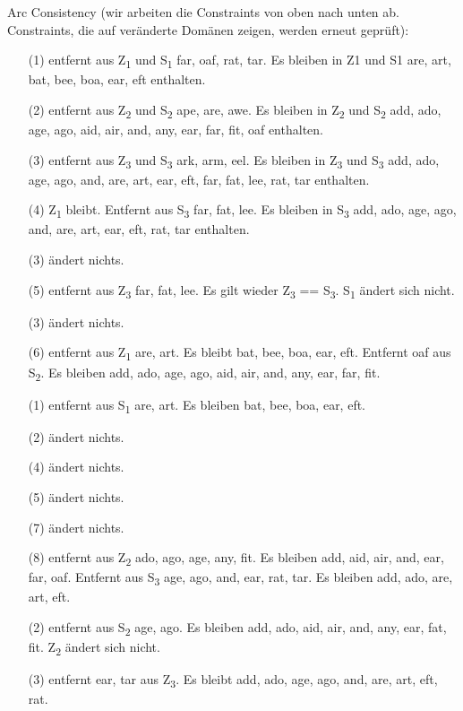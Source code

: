 \documentclass[ngerman]{fbi-aufgabenblatt}
\begin{document}
Arc Consistency (wir arbeiten die Constraints von oben nach unten ab. Constraints, die auf veränderte Domänen zeigen, werden erneut geprüft):
\begin{itemize}
	\item[(1)] entfernt aus Z\textsubscript{1} und S\textsubscript{1} far, oaf, rat, tar. Es bleiben in Z1 und S1 are, art, bat, bee, boa, ear, eft enthalten.
	\item[(2)] entfernt aus Z\textsubscript{2} und S\textsubscript{2} ape, are, awe. Es bleiben in Z\textsubscript{2} und S\textsubscript{2} add, ado, age, ago, aid, air, and, any, ear, far, fit, oaf enthalten.
	\item[(3)] entfernt aus Z\textsubscript{3} und S\textsubscript{3} ark, arm, eel. Es bleiben in Z\textsubscript{3} und S\textsubscript{3} add, ado, age, ago, and, are, art, ear, eft, far, fat, lee, rat, tar enthalten.
	\item[(4)] Z\textsubscript{1} bleibt. Entfernt aus S\textsubscript{3} far, fat, lee. Es bleiben in S\textsubscript{3} add, ado, age, ago, and, are, art, ear, eft, rat, tar enthalten.
	\item[(3)] ändert nichts.
	\item[(5)] entfernt aus Z\textsubscript{3} far, fat, lee. Es gilt wieder Z\textsubscript{3} == S\textsubscript{3}. S\textsubscript{1} ändert sich nicht.
	\item[(3)] ändert nichts.
	\item[(6)] entfernt aus Z\textsubscript{1} are, art. Es bleibt bat, bee, boa, ear, eft. Entfernt oaf aus S\textsubscript{2}. Es bleiben add, ado, age, ago, aid, air, and, any, ear, far, fit.
	\item[(1)] entfernt aus S\textsubscript{1} are, art. Es bleiben bat, bee, boa, ear, eft.
	\item[(2)] ändert nichts.
	\item[(4)] ändert nichts.
	\item[(5)] ändert nichts.
	\item[(7)] ändert nichts.
	\item[(8)] entfernt aus Z\textsubscript{2} ado, ago, age, any, fit. Es bleiben add, aid, air, and, ear, far, oaf. Entfernt aus S\textsubscript{3} age, ago, and, ear, rat, tar. Es bleiben add, ado, are, art, eft.
	\item[(2)] entfernt aus S\textsubscript{2} age, ago. Es bleiben add, ado, aid, air, and, any, ear, fat, fit. Z\textsubscript{2} ändert sich nicht.
	\item[(3)] entfernt ear, tar aus Z\textsubscript{3}. Es bleibt add, ado, age, ago, and, are, art, eft, rat.

\end{itemize}
\end{document}
